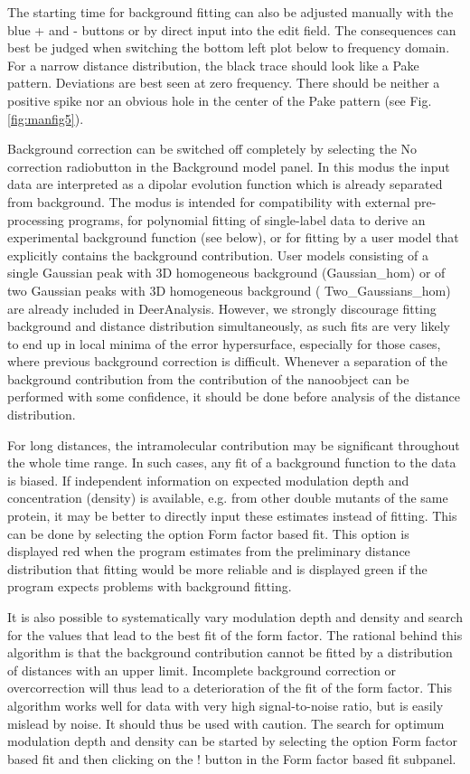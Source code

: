 \documentclass{article}
\begin{document}
The starting time for background fitting can also be adjusted manually with
the blue {\ttfamily +} and {\ttfamily -} buttons or by direct input into the edit field. The consequences can best be judged when switching the bottom left plot below to frequency
domain. For a narrow distance distribution, the black trace should look like
a Pake pattern. Deviations are best seen at zero frequency. There should be
neither a positive spike nor an obvious hole in the center of the Pake pattern
(see Fig. \ref{fig:manfig5}).

Background correction can be switched off completely by selecting the {\ttfamily No
correction} radiobutton in the {\ttfamily Background model} panel. In this modus the input data are interpreted as a dipolar evolution function which is already separated from background. The
modus is intended for compatibility with external pre-processing programs,
for polynomial fitting of single-label data to derive an experimental background
function (see below), or for fitting by a user model that explicitly contains the background contribution. User models consisting of a single Gaussian peak with 3D homogeneous background ({\ttfamily Gaussian\_hom}) or of two Gaussian peaks with 3D homogeneous background ({\ttfamily 
Two\_Gaussians\_hom}) are already included in DeerAnalysis. However, we strongly discourage fitting background and distance distribution simultaneously, as such fits are very likely to end up in local minima of the error hypersurface, especially for those cases, where previous background correction is difficult. Whenever a separation of the background contribution from the contribution of the nanoobject can be performed with some confidence, it should be done before analysis of the distance distribution.

For long distances, the intramolecular contribution may be significant throughout the whole time range. In such cases, any fit of a background function to the data is biased. If independent information on expected modulation depth and concentration (density) is available, e.g. from other double mutants of the same protein, it may be better to directly input these estimates instead of fitting. This can be done by selecting the option {\ttfamily Form factor based fit}. This option is displayed red when the program estimates from the preliminary distance distribution that fitting would be more reliable and is displayed green if the program expects problems with background fitting. 

It is also possible to systematically vary modulation depth and density and search for the values that lead to the best fit of the form factor. The rational behind this algorithm is that the background contribution cannot be fitted by a distribution of distances with an upper limit. Incomplete background correction or overcorrection will thus lead to a deterioration of the fit of the form factor. This algorithm works well for data with very high signal-to-noise ratio, but is easily mislead by noise. It should thus be used with caution. The search for optimum modulation depth and density can be started by selecting the option {\ttfamily Form factor based fit} and then clicking on the {\ttfamily !} button in the {\ttfamily Form factor based fit} subpanel.
\end{document}
